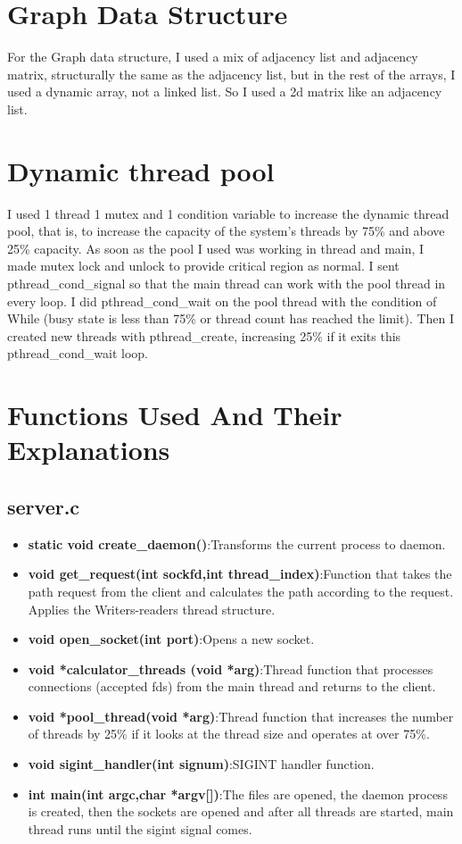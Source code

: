 \documentclass{article}
\begin{document}
\section{Graph Data Structure}
\par{For the Graph data structure, I used a mix of adjacency list and adjacency matrix, structurally the same as the adjacency list, but in the rest of the arrays, I used a dynamic array, not a linked list. So I used a 2d matrix like an adjacency list.}

\newpage

\section{Dynamic thread pool}
\par{I used 1 thread 1 mutex and 1 condition variable to increase the dynamic thread pool, that is, to increase the capacity of the system's threads by 75\% and above 25\% capacity. As soon as the pool I used was working in thread and main, I made mutex lock and unlock to provide critical region as normal. I sent pthread\_cond\_signal so that the main thread can work with the pool thread in every loop. I did pthread\_cond\_wait on the pool thread with the condition of While (busy state is less than 75\% or thread count has reached the limit). Then I created new threads with pthread\_create, increasing 25\% if it exits this pthread\_cond\_wait loop.}


\section{Functions Used And Their Explanations}
\subsection{server.c}
\begin{itemize}
    \item \textbf{static void create\_daemon()}:Transforms the current process to daemon.
    \item \textbf{void get\_request(int sockfd,int thread\_index)}:Function that takes the path request from the client and calculates the path according to the request. Applies the Writers-readers thread structure.
    \item \textbf{void open\_socket(int port)}:Opens a new socket.
    \item \textbf{void *calculator\_threads (void *arg)}:Thread function that processes connections (accepted fds) from the main thread and returns to the client.
    \item \textbf{void *pool\_thread(void *arg)}:Thread function that increases the number of threads by 25\% if it looks at the thread size and operates at over 75\%. 
    \item \textbf{void sigint\_handler(int signum)}:SIGINT handler function.
    \item \textbf{int main(int argc,char *argv[])}:The files are opened, the daemon process is created, then the sockets are opened and after all threads are started, main thread runs until the sigint signal comes.
    
\end{itemize}
\end{document}
